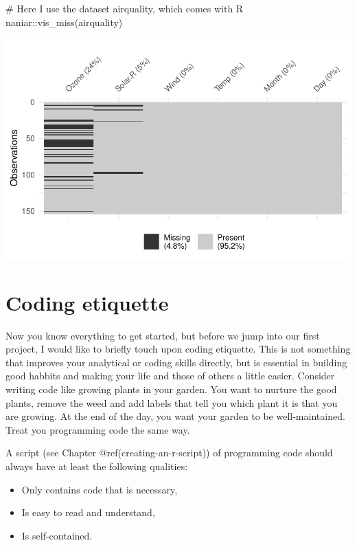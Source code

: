 \documentclass[
  letterpaper,
]{krantz}
\makeatletter
\newenvironment{Shaded}{\begin{snugshade}}{\end{snugshade}}
\newcommand{\CommentTok}[1]{\textcolor[rgb]{0.37,0.37,0.37}{#1}}
\newcommand{\FunctionTok}[1]{\textcolor[rgb]{0.28,0.35,0.67}{#1}}
\newcommand{\NormalTok}[1]{\textcolor[rgb]{0.00,0.23,0.31}{#1}}
\newcommand{\SpecialCharTok}[1]{\textcolor[rgb]{0.37,0.37,0.37}{#1}}
\newenvironment{kframe}{%
\medskip{}
\setlength{\fboxsep}{.8em}
 \def\at@end@of@kframe{}%
 \ifinner\ifhmode%
  \def\at@end@of@kframe{\end{minipage}}%
  \begin{minipage}{\columnwidth}%
 \fi\fi%
 \def\FrameCommand##1{\hskip\@totalleftmargin \hskip-\fboxsep
 \colorbox{shadecolor}{##1}\hskip-\fboxsep
     \hskip-\linewidth \hskip-\@totalleftmargin \hskip\columnwidth}%
 \MakeFramed {\advance\hsize-\width
   \@totalleftmargin\z@ \linewidth\hsize
   \@setminipage}}%
 {\par\unskip\endMakeFramed%
 \at@end@of@kframe}
\renewenvironment{Shaded}{\begin{kframe}}{\end{kframe}}
\makeatother
\begin{document}
\begin{Shaded}
\begin{Highlighting}[]
\CommentTok{\# Here I use the dataset \textquotesingle{}airquality\textquotesingle{}, which comes with R}
\NormalTok{naniar}\SpecialCharTok{::}\FunctionTok{vis\_miss}\NormalTok{(airquality)}
\end{Highlighting}
\end{Shaded}

\includegraphics{05_r_basics_files/figure-pdf/explicitly-calling-functions-1.pdf}

\section{Coding etiquette}\label{sec-coding-etiquette}

Now you know everything to get started, but before we jump into our
first project, I would like to briefly touch upon coding etiquette. This
is not something that improves your analytical or coding skills
directly, but is essential in building good habbits and making your life
and those of others a little easier. Consider writing code like growing
plants in your garden. You want to nurture the good plants, remove the
weed and add labels that tell you which plant it is that you are
growing. At the end of the day, you want your garden to be
well-maintained. Treat you programming code the same way.

A script (see Chapter @ref(creating-an-r-script)) of programming code
should always have at least the following qualities:

\begin{itemize}
\item
  Only contains code that is necessary,
\item
  Is easy to read and understand,
\item
  Is self-contained.
\end{itemize}
\end{document}
